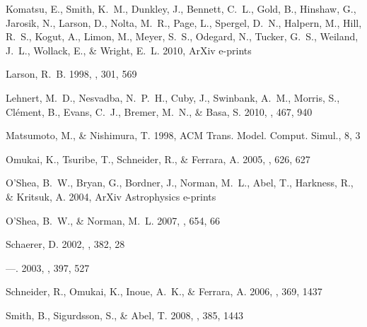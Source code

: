 \documentclass[12pt,preprint]{aastex}
\begin{document}
\begin{thebibliography}{50}
{Komatsu}, E., {Smith}, K.~M., {Dunkley}, J., {Bennett}, C.~L., {Gold}, B.,
  {Hinshaw}, G., {Jarosik}, N., {Larson}, D., {Nolta}, M.~R., {Page}, L.,
  {Spergel}, D.~N., {Halpern}, M., {Hill}, R.~S., {Kogut}, A., {Limon}, M.,
  {Meyer}, S.~S., {Odegard}, N., {Tucker}, G.~S., {Weiland}, J.~L., {Wollack},
  E., \& {Wright}, E.~L. 2010, ArXiv e-prints

{Larson}, R.~B. 1998, \mnras, 301, 569

{Lehnert}, M.~D., {Nesvadba}, N.~P.~H., {Cuby}, J., {Swinbank}, A.~M.,
  {Morris}, S., {Cl{\'e}ment}, B., {Evans}, C.~J., {Bremer}, M.~N., \& {Basa},
  S. 2010, \nat, 467, 940

Matsumoto, M., \& Nishimura, T. 1998, ACM Trans. Model. Comput. Simul., 8, 3

{Omukai}, K., {Tsuribe}, T., {Schneider}, R., \& {Ferrara}, A. 2005, \apj, 626,
  627

{O'Shea}, B.~W., {Bryan}, G., {Bordner}, J., {Norman}, M.~L., {Abel}, T.,
  {Harkness}, R., \& {Kritsuk}, A. 2004, ArXiv Astrophysics e-prints

{O'Shea}, B.~W., \& {Norman}, M.~L. 2007, \apj, 654, 66

{Schaerer}, D. 2002, \aap, 382, 28

---. 2003, \aap, 397, 527

{Schneider}, R., {Omukai}, K., {Inoue}, A.~K., \& {Ferrara}, A. 2006, \mnras,
  369, 1437

{Smith}, B., {Sigurdsson}, S., \& {Abel}, T. 2008, \mnras, 385, 1443


\end{thebibliography}
\end{document}
